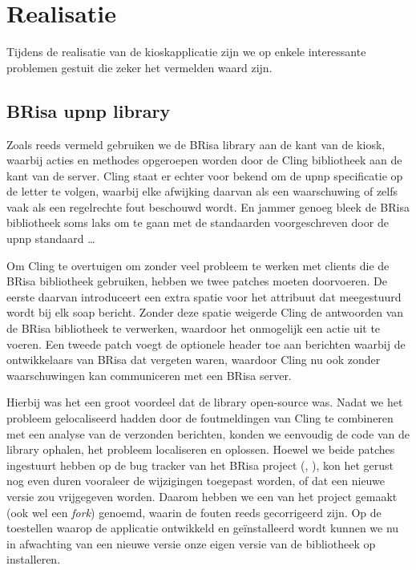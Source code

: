 \chapter{Realisatie}

Tijdens de realisatie van de kioskapplicatie zijn we op enkele interessante problemen gestuit die zeker het vermelden waard zijn.

\section{BRisa \ac{upnp} library}

Zoals reeds vermeld gebruiken we de BRisa library aan de kant van de kiosk, waarbij acties en methodes opgeroepen worden door de Cling bibliotheek aan de kant van de server. Cling staat er echter voor bekend om de \ac{upnp} specificatie op de letter te volgen, waarbij elke afwijking daarvan als een waarschuwing of zelfs vaak als een regelrechte fout beschouwd wordt. En jammer genoeg bleek de BRisa bibliotheek soms laks om te gaan met de standaarden voorgeschreven door de \ac{upnp} standaard \ldots

Om Cling te overtuigen om zonder veel probleem te werken met clients die de BRisa bibliotheek gebruiken, hebben we twee patches moeten doorvoeren. De eerste daarvan introduceert een extra spatie voor het  attribuut dat meegestuurd wordt bij elk \ac{soap} bericht. Zonder deze spatie weigerde Cling de antwoorden van de BRisa bibliotheek te verwerken, waardoor het onmogelijk een actie uit te voeren. Een tweede patch voegt de optionele  header toe aan berichten waarbij de ontwikkelaars van BRisa dat vergeten waren, waardoor Cling nu ook zonder waarschuwingen kan communiceren met een BRisa server.

Hierbij was het een groot voordeel dat de library open-source was. Nadat we het probleem gelocaliseerd hadden door de foutmeldingen van Cling te combineren met een analyse van de verzonden berichten, konden we eenvoudig de code van de library ophalen, het probleem localiseren en oplossen. Hoewel we beide patches ingestuurt hebben op de bug tracker van het BRisa project (, ), kon het gerust nog even duren vooraleer de wijzigingen toegepast worden, of dat een nieuwe versie zou vrijgegeven worden. Daarom hebben we een  van het project gemaakt (ook wel een \emph{fork}) genoemd, waarin de fouten reeds gecorrigeerd zijn. Op de toestellen waarop de applicatie ontwikkeld en geïnstalleerd wordt kunnen we nu in afwachting van een nieuwe versie onze eigen versie van de bibliotheek op installeren.

